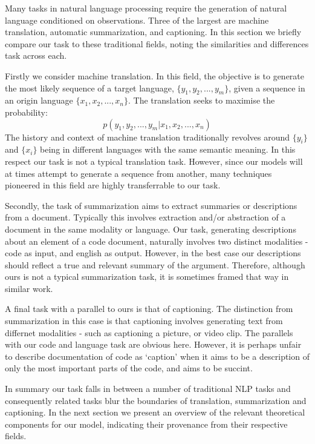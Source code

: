Many tasks in natural language processing require the generation of natural language conditioned on observations.
Three of the largest are machine translation, automatic summarization, and captioning.
In this section we briefly compare our task to these traditional fields, noting the similarities and differences task across each.

Firstly we consider machine translation. In this field, the objective is to generate the most likely sequence of a target language, $\{y_1, y_2,..., y_m\}$, given a sequence in an origin language  $\{x_1, x_2,..., x_n\}$. 
The translation seeks to maximise the probability:
$$ p(y_1, y_2,..., y_m| x_1, x_2,...,x_n )$$
The history and context of machine translation traditionally revolves around $\{y_i\}$ and $\{x_i\}$ being in different languages with the same semantic meaning. 
In this respect our task is not a typical translation task.
However, since our models will at times attempt to generate a sequence from another, many techniques pioneered in this field are highly transferrable to our task.

Secondly, the task of summarization aims to extract summaries or descriptions from a document.
Typically this involves extraction and/or abstraction of a document in the same modality or language.
Our task, generating descriptions about an element of a code document, naturally involves two distinct modalities - code as input, and english as output.
However, in the best case our descriptions should reflect a true and relevant summary of the argument.
Therefore, although ours is not a typical summarization task, it is sometimes framed that way in similar work\cite{iyer_summarizing_2016}.

A final task with a parallel to ours is that of captioning. 
The distinction from summarization in this case is that captioning involves generating text from differnet modalities - such as captioning a picture, or video clip.
The parallels with our code and language task are obvious here. However, it is perhaps unfair to describe documentation of code as `caption' when it aims to be a description of only the most important parts of the code, and aims to be succint.

In summary our task falls in between a number of traditional NLP tasks and consequently related tasks blur the boundaries of translation, summarization and captioning. In the next section we present an overview of the relevant theoretical components for our model, indicating their provenance from their respective fields.

